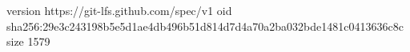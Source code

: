 version https://git-lfs.github.com/spec/v1
oid sha256:29e3c243198b5e5d1ae4db496b51d814d7d4a70a2ba032bde1481c0413636c8c
size 1579
